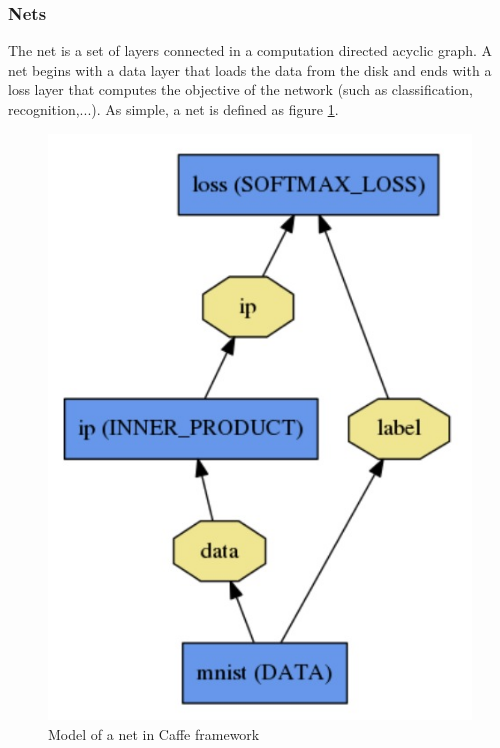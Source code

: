 \subsubsection{Nets}
The net is a set of layers connected in a computation directed acyclic graph. A net begins with a data layer that loads the data from the disk and ends with a loss layer that computes the objective of the network (such as classification, recognition,...). As simple, a net is defined as figure \ref{figcaffenet}.
\begin{figure}[!h]
	\centering
	\includegraphics[scale=0.5]{images/caffenet}
	\caption{Model of a net in Caffe framework}
	\label{figcaffenet}
\end{figure}
